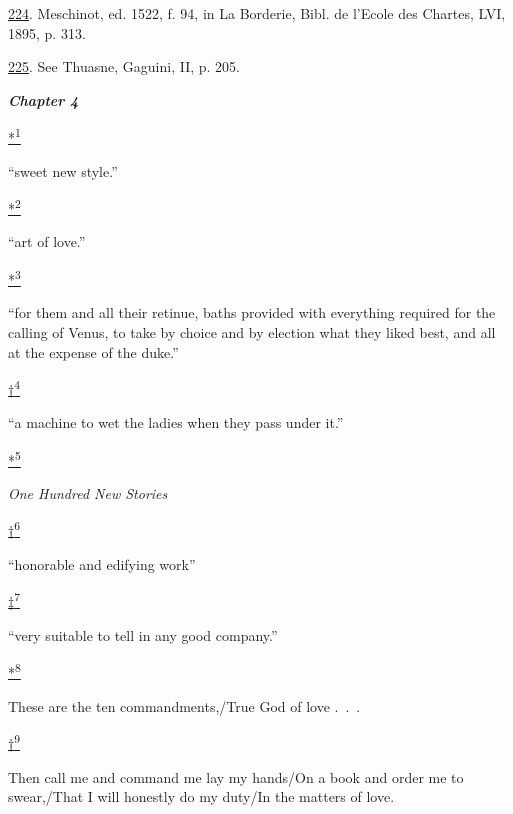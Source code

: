 \protect\hypertarget{23_NOTES.xhtmlux5cux23page_412}{\protect\hyperlink{10_Chapter_Three__THE_HEROIC_DREAM.xhtmlux5cux23id_1490}{224}}.
Meschinot, ed. 1522, f. 94, in La Borderie, Bibl. de l'Ecole des
Chartes, LVI, 1895, p. 313.

\protect\hypertarget{23_NOTES.xhtmlux5cux23id_1489}{\protect\hyperlink{10_Chapter_Three__THE_HEROIC_DREAM.xhtmlux5cux23id_1488}{225}}.
See Thuasne, Gaguini, II, p. 205.

\textbf{\emph{Chapter 4}}

\protect\hypertarget{23_NOTES.xhtmlux5cux23id_3102}{\protect\hyperlink{11_Chapter_Four__THE_FORMS_OF_LOVE.xhtmlux5cux23id_3101}{*\textsuperscript{1}}}
``sweet new style.''

\protect\hypertarget{23_NOTES.xhtmlux5cux23id_3104}{\protect\hyperlink{11_Chapter_Four__THE_FORMS_OF_LOVE.xhtmlux5cux23id_3103}{*\textsuperscript{2}}}
``art of love.''

\protect\hypertarget{23_NOTES.xhtmlux5cux23id_3106}{\protect\hyperlink{11_Chapter_Four__THE_FORMS_OF_LOVE.xhtmlux5cux23id_3105}{*\textsuperscript{3}}}
``for them and all their retinue, baths provided with everything
required for the calling of Venus, to take by choice and by election
what they liked best, and all at the expense of the duke.''

\protect\hypertarget{23_NOTES.xhtmlux5cux23id_3108}{\protect\hyperlink{11_Chapter_Four__THE_FORMS_OF_LOVE.xhtmlux5cux23id_3107}{†\textsuperscript{4}}}
``a machine to wet the ladies when they pass under it.''

\protect\hypertarget{23_NOTES.xhtmlux5cux23id_3110}{\protect\hyperlink{11_Chapter_Four__THE_FORMS_OF_LOVE.xhtmlux5cux23id_3109}{*\textsuperscript{5}}}
\emph{One Hundred New Stories}

\protect\hypertarget{23_NOTES.xhtmlux5cux23id_3112}{\protect\hyperlink{11_Chapter_Four__THE_FORMS_OF_LOVE.xhtmlux5cux23id_3111}{†\textsuperscript{6}}}
``honorable and edifying work''

\protect\hypertarget{23_NOTES.xhtmlux5cux23id_3114}{\protect\hyperlink{11_Chapter_Four__THE_FORMS_OF_LOVE.xhtmlux5cux23id_3113}{‡\textsuperscript{7}}}
``very suitable to tell in any good company.''

\protect\hypertarget{23_NOTES.xhtmlux5cux23id_3116}{\protect\hyperlink{11_Chapter_Four__THE_FORMS_OF_LOVE.xhtmlux5cux23id_3115}{*\textsuperscript{8}}}
These are the ten commandments,/True God of love .~.~.

\protect\hypertarget{23_NOTES.xhtmlux5cux23id_3118}{\protect\hyperlink{11_Chapter_Four__THE_FORMS_OF_LOVE.xhtmlux5cux23id_3117}{†\textsuperscript{9}}}
Then call me and command me lay my hands/On a book and order me to
swear,/That I will honestly do my duty/In the matters of love.

